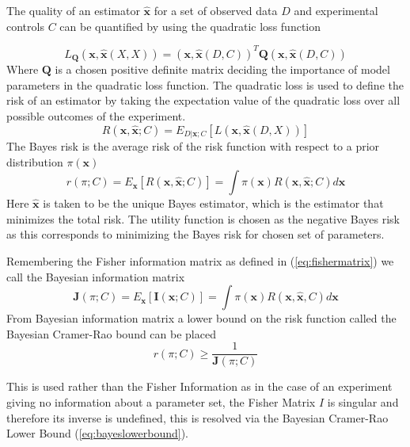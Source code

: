 The quality of an estimator $\mathbf{\hat{x}}$ for a set of observed data $D$ and experimental controls $C$ can be quantified by using the quadratic loss function 

\begin{equation}
L_{\mathbf{Q}}(\mathbf{x},\mathbf{\hat{x}}(X,X)) = (\mathbf{x},\mathbf{\hat{x}}(D,C))^T\mathbf{Q}(\mathbf{x},\mathbf{\hat{x}}(D,C))
\label{eq:quadraticloss}
\end{equation}
Where $\mathbf{Q}$ is a chosen positive definite matrix deciding the importance of model parameters in the quadratic loss function. The quadratic loss is used to define the risk of an estimator by taking the expectation value of the quadratic loss over all possible outcomes of the experiment.
\begin{equation}
R(\mathbf{x},\mathbf{\hat{x}};C) = E_{D|\mathbf{x};C}[L(\mathbf{x},\mathbf{\hat{x}}(D,X))]
\label{eq:risk}
\end{equation}
The Bayes risk is the average risk of the risk function with respect to a prior distribution $\pi(\mathbf{x})$
\begin{equation}
r(\pi;C) = E_\mathbf{x}[R(\mathbf{x},\mathbf{\hat{x}};C)] = \int \pi(\mathbf{x})R(\mathbf{x},\mathbf{\hat{x}};C)d\mathbf{x}
\label{eq:bayesrisk}
\end{equation}
Here $\mathbf{\hat{x}}$ is taken to be the unique Bayes estimator, which is the estimator that minimizes the total risk. The utility function is chosen as the negative Bayes risk as this corresponds to minimizing the Bayes risk for chosen set of parameters. 
 
Remembering the Fisher information matrix as defined in (\ref{eq:fishermatrix}) we call the Bayesian information matrix\cite{bayesiancramer}
\begin{equation}
\mathbf{J}(\pi;C) = E_\mathbf{x}[\mathbf{I}(\mathbf{x};C)] = \int \pi(\mathbf{x})R(\mathbf{x},\mathbf{\hat{x}},C)d\mathbf{x}
\label{eq:bayesianinformation}
\end{equation}
From Bayesian information matrix a lower bound on the risk function called the Bayesian Cramer-Rao bound can be placed \cite{bcrb}
\begin{equation}
\label{eq:bayeslowerbound}
r(\pi;C)\geq \frac{1}{\mathbf{J}(\pi;C)}
\end{equation}

This is used rather than the Fisher Information as in the case of an experiment giving no information about a parameter set, the Fisher Matrix $I$ is singular and therefore its inverse is undefined, this is resolved via the Bayesian Cramer-Rao Lower Bound (\ref{eq:bayeslowerbound}). 

